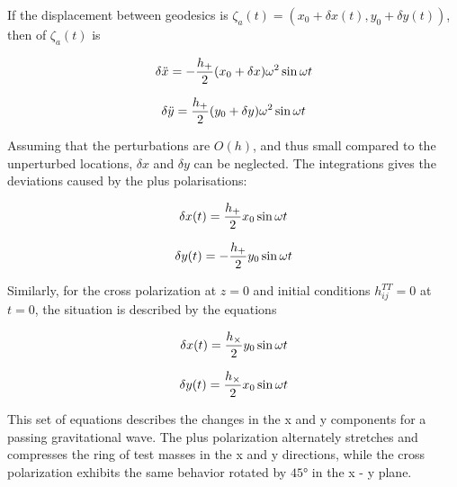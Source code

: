 \documentclass[binding=0.6cm, LaM]{sapthesis}
\begin{document}
	If the displacement between geodesics is $\zeta_a (t) = (x_0 + \delta x(t), y_0 + \delta y(t))$, then of $\zeta_a (t)$ is

		\begin{equation}
		\delta {\ddot x} = - {{h_{+}} \over 2} (x_0 + \delta x) \omega ^2 \sin \omega t
		\end{equation}

		\begin{equation}
		\delta {\ddot y} =  {{h_{+}} \over 2} (y_0 + \delta y) \omega ^2 \sin \omega t
		\end{equation}

	Assuming that the perturbations are $O(h)$, and thus small compared to the unperturbed locations, $\delta x$ and $\delta y$ can be neglected.
	The integrations gives the deviations caused by the plus polarisations:

		\begin{equation}
		\delta x(t) =  {{h_{+}} \over 2} x_0 \sin \omega t
		\end{equation}

		\begin{equation}
		\delta y(t) = - {{h_{+}} \over 2} y_0  \sin \omega t
		\end{equation}

	Similarly, for the cross polarization at $z=0$ and initial conditions $h_{ij}^{TT} = 0$ at $t= 0$, the situation is described by the equations
		
		\begin{equation}
		\delta x(t) =  {{h_{\times}} \over 2} y_0 \sin \omega t
		\end{equation}

		\begin{equation}
		\delta y(t) =  {{h_{\times}} \over 2} x_0  \sin \omega t
		\end{equation}
		
	This set of equations describes the changes in the x and y components for a passing gravitational wave.
	The plus polarization alternately stretches and compresses the ring of test masses in the x and y directions, 
	while the cross polarization exhibits the same behavior rotated by $\ang{45}$ in the x - y plane.
\end{document}
